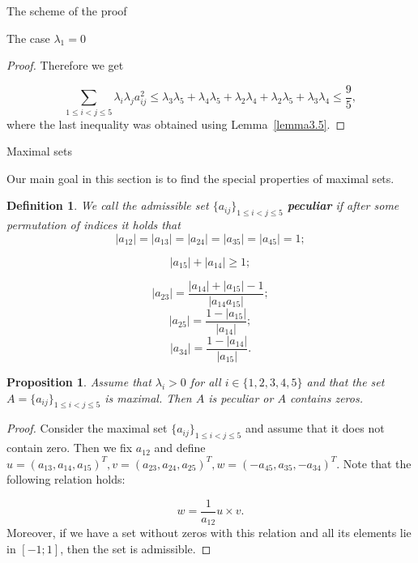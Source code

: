 \documentclass[12pt]{article}
\newtheorem{proposition}{Proposition}[section]
\newtheorem{definition}{Definition}[section]
\begin{document}
\begin{section}{The scheme of the proof}
\begin{section}{The case  \texorpdfstring{$\lambda_{1} = 0$}{Lg}}
\begin{proof}
     Therefore we get
    
    $$
        \sum_{1\leq i < j\leq 5}\lambda_{i}\lambda_{j} a_{ij}^{2} \leq \lambda_{3}\lambda_{5} + \lambda_{4}\lambda_{5} + \lambda_{2}\lambda_{4} + \lambda_{2}\lambda_{5} + \lambda_{3}\lambda_{4}\leq \frac{9}{5},
    $$
    where the last inequality was obtained using Lemma~\ref{lemma3.5}.

\end{proof}
    
\end{section}

\end{section}

\begin{section}{Maximal sets}
\label{s6}

    Our main goal in this section is to find the special properties of maximal sets.
    
    \begin{definition}
    \label{def-bad}
        We call the admissible set $\{a_{ij}\}_{1\leq i<j\leq 5}$  \textbf{ peculiar} if after some permutation of indices it holds that 
        $$
            |a_{12}|=|a_{13}|=|a_{24}|=|a_{35}|=|a_{45}|=1;
        $$ 
        
        $$
            |a_{15}| + |a_{14}|\geq 1;
        $$ 
        
        $$
            |a_{23}| = \frac{|a_{14}| + |a_{15}| - 1}{|a_{14}a_{15}|};
        $$
        $$
            |a_{25}| = \frac{1-|a_{15}|}{|a_{14}|};
        $$
        $$
            |a_{34}| = \frac{1-|a_{14}|}{|a_{15}|}.
        $$
    \end{definition}
    
    \begin{proposition}
        \label{max-form}
        Assume that $\lambda_{i}> 0$ for all $i\in\{1,2,3,4,5\}$ and that the set $A=\{a_{ij}\}_{1\leq i<j\leq 5}$ is maximal. Then $A$ is  peculiar or $A$ contains zeros. 
    \end{proposition}
    
    \begin{proof}
        Consider the maximal set $\{a_{ij}\}_{1\leq i < j\leq 5}$ and assume that it does not contain zero. Then we fix $a_{12}$ and define $u=(a_{13}, a_{14}, a_{15})^{T}, v=(a_{23},a_{24},a_{25})^{T}, w = (-a_{45},a_{35},-a_{34})^{T}$. Note that the following relation holds:
    
        $$
            w = \frac{1}{a_{12}}u\times v.
        $$
        Moreover, if we have a set without zeros with this relation and all its elements lie in $[-1;1]$, then the set is admissible. 
    

\end{proof}
\end{section}
\end{document}

